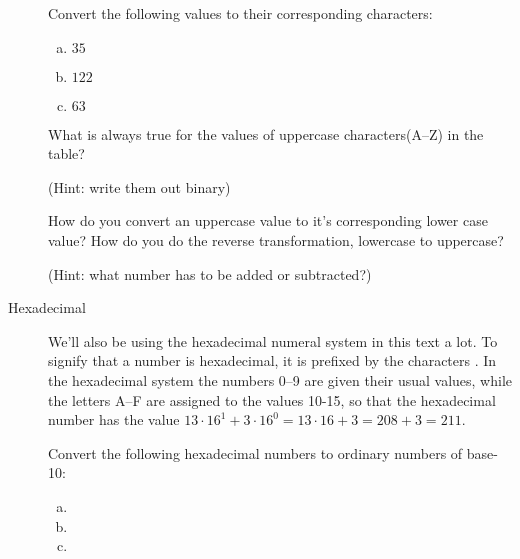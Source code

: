 \begin{description}
  \begin{Exercise}[label={num-to-ascii}]
    Convert the following \ascii values to their corresponding characters:
    \begin{enumerate}[(a)]
    \item $35$
    \item $122$
    \item $63$
    \end{enumerate}
  \end{Exercise}

  \begin{Exercise}[label={ascii-uppercase}]

    What is always true for the \ascii values of uppercase characters(A--Z)
    in the \ascii table?

    (Hint: write them out binary)

  \end{Exercise}

  \begin{Exercise}[label={uppercase-conv}]

    How do you convert an uppercase \ascii value to it's corresponding
    lower case value? How do you do the reverse transformation,
    lowercase to uppercase?

    (Hint: what number has to be added or subtracted?)

  \end{Exercise}

\item[Hexadecimal] We'll also be using the hexadecimal numeral system
  in this text a lot. To signify that a number is hexadecimal, it is
  prefixed by the characters \hex{}. In the hexadecimal system the
  numbers 0--9 are given their usual values, while the letters A--F are
  assigned to the values 10-15, so that the hexadecimal number
   has the value $13 \cdot 16^1 + 3 \cdot 16^0 = 13 \cdot 16 +
  3 = 208 + 3 = 211$.

  \begin{Exercise}[label={hex-to-n}]
    Convert the following hexadecimal numbers to ordinary numbers of
    base-10:

    \begin{enumerate}[(a)]
    \item {}
    \item {}
    \item {}
    \end{enumerate}

  \end{Exercise}


\end{description}
